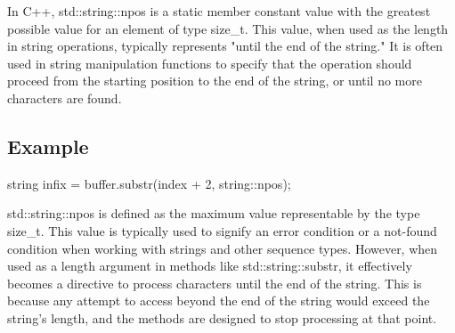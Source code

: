 \documentclass{report}
\begin{document}
    \pagebreak 
    \bigbreak \noindent 
    \begin{concept}
        In C++, std::string::npos is a static member constant value with the greatest possible value for an element of type size\_t. This value, when used as the length in string operations, typically represents "until the end of the string." It is often used in string manipulation functions to specify that the operation should proceed from the starting position to the end of the string, or until no more characters are found.
    \end{concept}
    \bigbreak \noindent 
    \subsection{Example}
    \bigbreak \noindent 
    \begin{cppcode}
    string infix = buffer.substr(index + 2, string::npos);
    \end{cppcode}
    \bigbreak \noindent 
    std::string::npos is defined as the maximum value representable by the type size\_t. This value is typically used to signify an error condition or a not-found condition when working with strings and other sequence types. However, when used as a length argument in methods like std::string::substr, it effectively becomes a directive to process characters until the end of the string. This is because any attempt to access beyond the end of the string would exceed the string's length, and the methods are designed to stop processing at that point.
    

    
\end{document}

